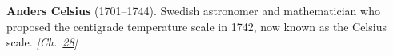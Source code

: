 \textbf{Anders Celsius} (1701–1744). Swedish astronomer and mathematician who proposed the centigrade temperature scale in 1742, now known as the Celsius scale. \emph{[Ch.~\hyperref[ch:negativetemperature]{28}]}

